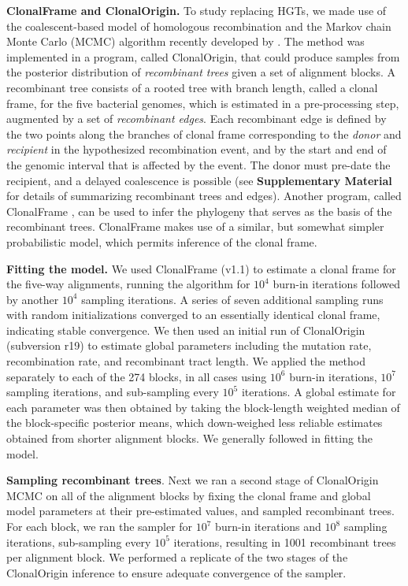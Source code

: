 \documentclass[12pt]{article}
\begin{document}
{\bf ClonalFrame and ClonalOrigin.}  To study replacing HGTs, we made use
of the coalescent-based model of homologous recombination and the Markov
chain Monte Carlo (MCMC) algorithm recently developed by
\cite{Didelot2010}.  The method was implemented in a 
program, called ClonalOrigin, that could produce samples from the posterior
distribution of {\em recombinant trees} given a set of alignment blocks. A
recombinant tree consists of a rooted tree with branch length, called a clonal
frame, for the five bacterial genomes,
which is estimated in a pre-processing step, augmented by a set of
{\em recombinant edges}. Each recombinant edge is defined by the two points
along the branches of clonal frame corresponding to the {\em donor} and
{\em recipient} in the hypothesized recombination event, and by the start
and end of the genomic interval that is affected by the event.  The donor
must pre-date the recipient, and a delayed coalescence is possible
(see \textbf{Supplementary Material} for details of summarizing recombinant
trees and edges). 
Another program, called ClonalFrame
\citep{Didelot2007}, can be used to infer the phylogeny that serves as the
basis of the recombinant trees.  ClonalFrame makes use of a similar, but
somewhat simpler probabilistic model, which permits inference
of the clonal frame. %

{\bf Fitting the model.}  We used
ClonalFrame (v1.1) to estimate 
a clonal frame for the five-way
alignments, running the algorithm for $10^4$ burn-in iterations followed by
another $10^4$ sampling iterations.  A series of seven additional sampling
runs with 
random initializations converged to an essentially identical clonal frame, %
indicating stable convergence.  We then used an initial run of
ClonalOrigin (subversion r19) to estimate global parameters including
the mutation rate, recombination rate, and recombinant tract length. We
applied the method separately to each of the 274 blocks, in all cases using
$10^6$ burn-in iterations, $10^7$ sampling iterations, and sub-sampling
every $10^5$ iterations. A global estimate for each parameter was then
obtained by taking the block-length weighted median of the block-specific
posterior means, which down-weighed less reliable estimates obtained from
shorter alignment blocks.  We generally followed \cite{Didelot2010} in 
fitting the model. %

{\bf Sampling recombinant trees}.  Next we ran a second stage of ClonalOrigin
MCMC
on all of the alignment blocks by fixing the clonal frame and global model
parameters at their pre-estimated values, and sampled
recombinant trees.  For each block, we ran the sampler for $10^7$ burn-in
iterations and $10^8$ sampling iterations, sub-sampling every $10^5$
iterations, resulting in 1001 recombinant trees per alignment block.  We
performed a replicate of the two stages of the ClonalOrigin inference to
ensure adequate convergence of the sampler.
\end{document}
